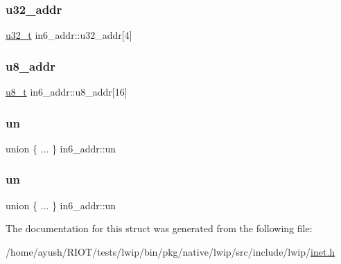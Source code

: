 \subsubsection{\texorpdfstring{u32\+\_\+addr}{u32\_addr}}
{\footnotesize\ttfamily \hyperlink{group__compiler__abstraction_ga4c14294869aceba3ef9d4c0c302d0f33}{u32\+\_\+t} in6\+\_\+addr\+::u32\+\_\+addr\mbox{[}4\mbox{]}}

\mbox{\label{structin6__addr_abfef295d9dd6db109a1f1f95eacdb5f6}} 
\subsubsection{\texorpdfstring{u8\+\_\+addr}{u8\_addr}}
{\footnotesize\ttfamily \hyperlink{group__compiler__abstraction_ga4caecabca98b43919dd11be1c0d4cd8e}{u8\+\_\+t} in6\+\_\+addr\+::u8\+\_\+addr\mbox{[}16\mbox{]}}

\mbox{\label{structin6__addr_ada825f4d581cfaae6c93a83412716971}} 
\subsubsection{\texorpdfstring{un}{un}\hspace{0.1cm}{\footnotesize\ttfamily [1/2]}}
{\footnotesize\ttfamily union \{ ... \}   in6\+\_\+addr\+::un}

\mbox{\label{structin6__addr_a3dd07f97c984fbda022a9b42301e3692}} 
\subsubsection{\texorpdfstring{un}{un}\hspace{0.1cm}{\footnotesize\ttfamily [2/2]}}
{\footnotesize\ttfamily union \{ ... \}   in6\+\_\+addr\+::un}



The documentation for this struct was generated from the following file\+:\begin{DoxyCompactItemize}
\item 
/home/ayush/\+R\+I\+O\+T/tests/lwip/bin/pkg/native/lwip/src/include/lwip/\hyperlink{native_2lwip_2src_2include_2lwip_2inet_8h}{inet.\+h}\end{DoxyCompactItemize}
